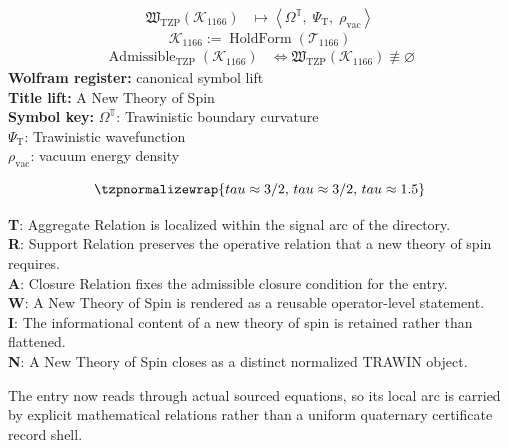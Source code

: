 \noindent
\begin{minipage}[t]{0.48\linewidth}
\begingroup
\small
\[
\begin{aligned}
\mathfrak{W}_{\mathrm{TZP}}\!\left(\mathcal{K}_{1166}\right)
&\longmapsto
\left\langle \Omega^{\mathbb{T}},\; \Psi_{\mathrm{T}},\; \rho_{\mathrm{vac}} \right\rangle
\end{aligned}
\]
\[
\mathcal{K}_{1166}
:=
\operatorname{HoldForm}\!\left(\mathcal{T}_{1166}\right)
\]
\[
\begin{aligned}
\operatorname{Admissible}_{\mathrm{TZP}}\!\left(\mathcal{K}_{1166}\right)
&\Longleftrightarrow
\mathfrak{W}_{\mathrm{TZP}}\!\left(\mathcal{K}_{1166}\right)\not\equiv\varnothing
\end{aligned}
\]
\textbf{Wolfram register:} canonical symbol lift\\
\textbf{Title lift:} A New Theory of Spin\\
\textbf{Symbol key:} \(\Omega^{\mathbb{T}}\): Trawinistic boundary curvature\\ \(\Psi_{\mathrm{T}}\): Trawinistic wavefunction\\ \(\rho_{\mathrm{vac}}\): vacuum energy density
\par
\endgroup
\end{minipage}\hfill
\begin{minipage}[t]{0.48\linewidth}
\[
\tzpnormalizewrap{tau \approx 3/2,\,tau \approx 3/2,\,tau \approx 1.5}
\]

\small
\textbf{T}: Aggregate Relation is localized within the signal arc of the directory.\\
\textbf{R}: Support Relation preserves the operative relation that a new theory of spin requires.\\
\textbf{A}: Closure Relation fixes the admissible closure condition for the entry.\\
\textbf{W}: A New Theory of Spin is rendered as a reusable operator-level statement.\\
\textbf{I}: The informational content of a new theory of spin is retained rather than flattened.\\
\textbf{N}: A New Theory of Spin closes as a distinct normalized TRAWIN object.
\normalsize
\end{minipage}

The entry now reads through actual sourced equations, so its local arc is carried by explicit mathematical relations rather than a uniform quaternary certificate record shell.
\clearpage

